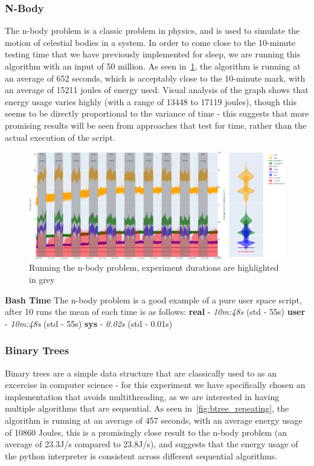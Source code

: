 \subsubsection{N-Body}
The n-body problem is a classic problem in physics, and is used to simulate the motion of celestial bodies in a system.
In order to come close to the 10-minute testing time that we have previously implemented for sleep, we are running this
algorithm with an input of 50 million.
As seen in~\ref{fig:nbody_repeating}, the algorithm is running at an average of 652 seconds, which is acceptably close
to the 10-minute mark, with an average of 15211 joules of energy used.
Visual analysis of the graph shows that energy usage varies highly (with a range of 13448 to 17119 joules), though this
seems to be directly proportional to the variance of time - this suggests that more promising results will be seen from
approaches that test for time, rather than the actual execution of the script.

\begin{figure}[H]
    \centering
    \includegraphics[width=15cm]{figures/implementation/nbody_repeating}
    \caption{Running the n-body problem, experiment durations are highlighted in grey}
    \label{fig:nbody_repeating}
\end{figure}

\textbf{Bash Time}
The n-body problem is a good example of a pure user space script, after 10 runs the mean of each time is as follows:
\textbf{real} - \textit{10m:48s} (std - 55s)
\textbf{user} - \textit{10m:48s} (std - 55s)
\textbf{sys} - \textit{0.02s} (std - 0.01s)

\subsubsection{Binary Trees}
Binary trees are a simple data structure that are classically used to as an excercise in computer science - for this
experiment we have specifically chosen an implementation that avoids multithreading, as we are interested in having
multiple algorithms that are sequential.
As seen in~\ref{fig:btree_repeating}, the algorithm is running at an average of 457 seconds, with an average energy
usage of 10860 Joules, this is a promisingly close result to the n-body problem (an average of 23.3J/s compared to
23.8J/s), and suggests that the energy usage of the python interpreter is consistent across different sequential
algorithms.


